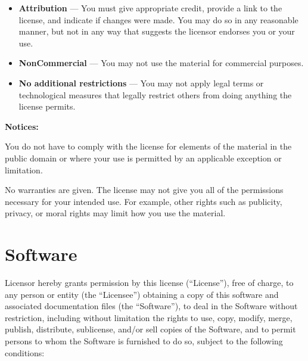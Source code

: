 \documentclass[krantzl]{krantz}
\begin{document}
\begin{itemize}

\item 

\textbf{Attribution} — You must give appropriate credit, provide a link to the
    license, and indicate if changes were made. You may do so in any reasonable
    manner, but not in any way that suggests the licensor endorses you or your
    use.



\item 

\textbf{NonCommercial} — You may not use the material for commercial purposes.



\item 

\textbf{No additional restrictions} — You may not apply legal terms or technological
    measures that legally restrict others from doing anything the license
    permits.



\end{itemize}


\noindent \textbf{Notices:}


You do not have to comply with the license for elements of the material in the
public domain or where your use is permitted by an applicable exception or
limitation.


No warranties are given. The license may not give you all of the permissions
necessary for your intended use. For example, other rights such as publicity,
privacy, or moral rights may limit how you use the material.

\section*{Software}


Licensor hereby grants permission by this license (“License”), free of charge,
to any person or entity (the “Licensee”) obtaining a copy of this software and
associated documentation files (the “Software”), to deal in the Software without
restriction, including without limitation the rights to use, copy, modify,
merge, publish, distribute, sublicense, and/or sell copies of the Software, and
to permit persons to whom the Software is furnished to do so, subject to the
following conditions:
\end{document}
